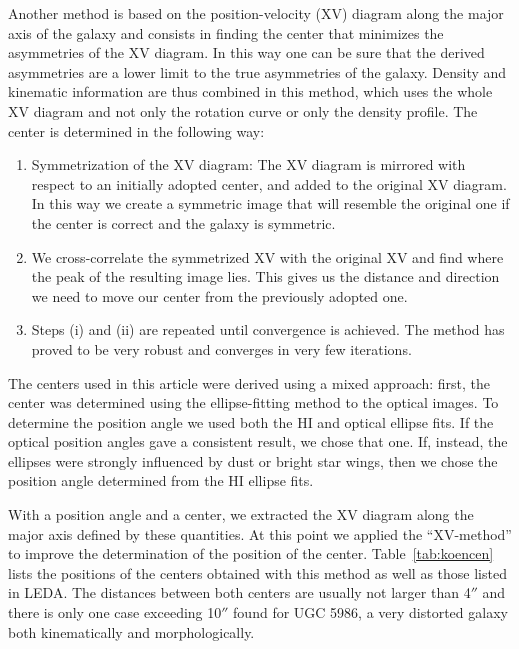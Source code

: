\documentclass{aa}
\begin{document}
Another method is based on the position-velocity (XV)
diagram along the major axis of the galaxy and consists in finding the
center that minimizes the asymmetries of the XV diagram. In this way
one can be sure that the derived asymmetries are a lower limit to
the true asymmetries of the galaxy. Density and kinematic
information are thus combined in this method, which uses the whole XV
diagram and not only the rotation curve or only the density profile.
The center is determined in the following way: 
\begin{enumerate}
\item
Symmetrization of the XV diagram: The XV diagram is mirrored with
respect to an initially adopted center, and 
added to the original XV diagram. In this way we create a symmetric image that
will resemble the original one if the center is correct and the
galaxy is symmetric.

\item
We cross-correlate the symmetrized XV with the original XV and find
where the peak of the resulting image lies. This gives us the distance
and direction we need to move our center from the previously adopted one.

\item
Steps (i) and (ii) are repeated until convergence is achieved. The meth\-od
has proved to be very robust and converges in very few iterations.
\end{enumerate}

The centers used in this article were derived using a mixed approach:
first, the center was determined using the ellipse-fitting method to
the optical images. To determine the position angle we used both
the HI and optical ellipse fits. If the optical position angles gave a
consistent result, we chose that one. If, instead, the ellipses were
strongly influenced by dust or bright star wings, then we chose the
position angle determined from the HI ellipse fits. 

With a position angle and a center, we extracted the XV
diagram along the major axis defined by these quantities. At this
point we applied the ``XV-method'' to improve the determination of the
position of the center. Table~\ref{tab:koencen} lists the positions of
the centers
obtained with this method as well as those listed in LEDA. The
distances between both centers are usually not larger than 4$''$ and
there is only one case exceeding 10$''$ found for UGC 5986, a
very distorted galaxy both kinematically and morphologically.
\end{document}
